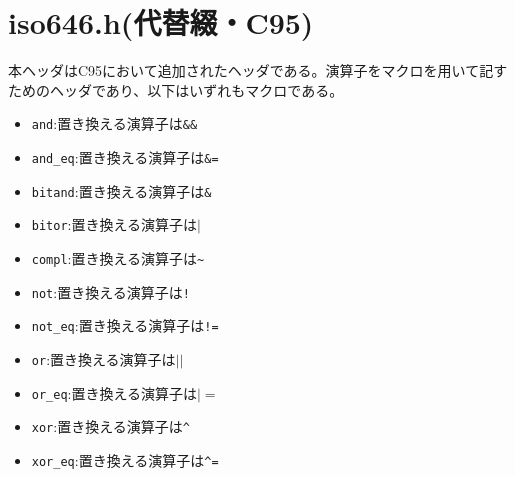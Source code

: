 \section{iso646.h(代替綴・C95)}
本ヘッダはC95において追加されたヘッダである。演算子をマクロを用いて記すためのヘッダであり、以下はいずれもマクロである。
\begin{multicols}{2}
\begin{itemize}
\item \verb|and|:置き換える演算子は\verb|&&|
\item \verb|and_eq|:置き換える演算子は\verb|&=|
\item \verb|bitand|:置き換える演算子は\verb|&|
\item \verb|bitor|:置き換える演算子は$|$
\item \verb|compl|:置き換える演算子は\verb|~|
\item \verb|not|:置き換える演算子は\verb|!|
\item \verb|not_eq|:置き換える演算子は\verb|!=|
\item \verb|or|:置き換える演算子は$||$
\item \verb|or_eq|:置き換える演算子は$|=$
\item \verb|xor|:置き換える演算子は\verb|^|
\item \verb|xor_eq|:置き換える演算子は\verb|^=|
\end{itemize}
\end{multicols}

